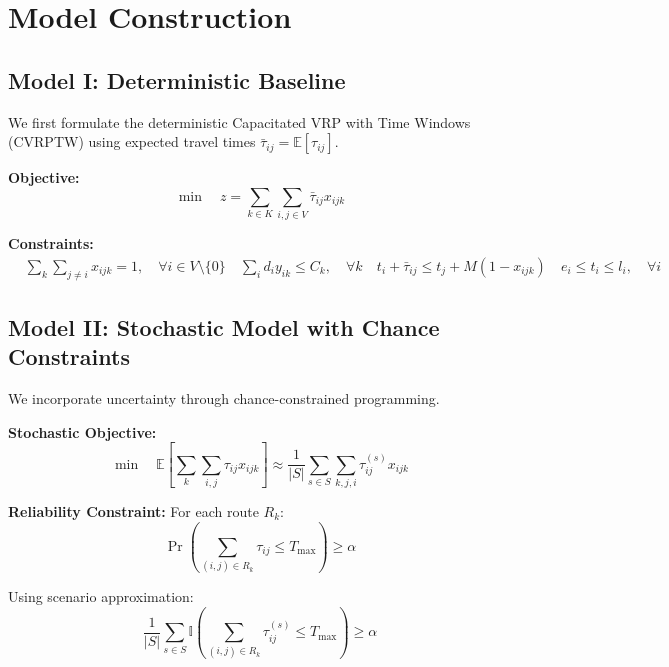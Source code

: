 \section{Model Construction}

\subsection{Model I: Deterministic Baseline}

We first formulate the deterministic Capacitated VRP with Time Windows (CVRPTW) using expected travel times $\bar{\tau}_{ij} = \mathbb{E}[\tau_{ij}]$.

\textbf{Objective:}
\begin{equation}
\min \quad z = \sum_{k \in K} \sum_{i,j \in V} \bar{\tau}_{ij} x_{ijk} \label{eq:det_obj}
\end{equation}

\textbf{Constraints:}
\begin{align}
& \sum_{k} \sum_{j \neq i} x_{ijk} = 1, \quad \forall i \in V \setminus \{0\} \label{eq:visit} \
& \sum_{i} d_i y_{ik} \leq C_k, \quad \forall k \label{eq:capacity} \
& t_i + \bar{\tau}_{ij} \leq t_j + M(1-x_{ijk}) \label{eq:time_consistency} \
& e_i \leq t_i \leq l_i, \quad \forall i \label{eq:timewindows}
\end{align}

\subsection{Model II: Stochastic Model with Chance Constraints}

We incorporate uncertainty through chance-constrained programming.

\textbf{Stochastic Objective:}
\begin{equation}
\min \quad \mathbb{E}\left[\sum_{k} \sum_{i,j} \tau_{ij} x_{ijk}\right] \approx \frac{1}{|S|}\sum_{s \in S} \sum_{k,j,i} \tau_{ij}^{(s)} x_{ijk} \label{eq:stochastic_obj}
\end{equation}

\textbf{Reliability Constraint:}
For each route $R_k$:
\begin{equation}
\Pr\left(\sum_{(i,j) \in R_k} \tau_{ij} \leq T_{\max}\right) \geq \alpha \label{eq:reliability}
\end{equation}

Using scenario approximation:
\begin{equation}
\frac{1}{|S|}\sum_{s \in S} \mathbb{I}\left(\sum_{(i,j) \in R_k} \tau_{ij}^{(s)} \leq T_{\max}\right) \geq \alpha \label{eq:scenario_reliability}
\end{equation}

